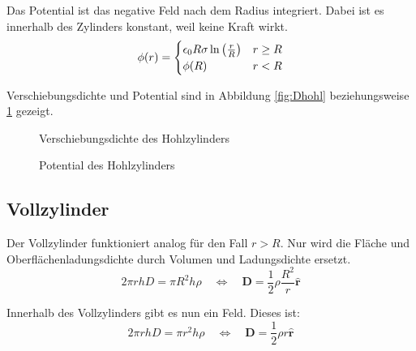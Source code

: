 \documentclass[11pt, ngerman]{article}
\newcommand{\half}{\frac 12}
\renewcommand{\vec}[1]{\boldsymbol{#1}}
\begin{document}
Das Potential ist das negative Feld nach dem Radius integriert. Dabei ist es innerhalb des Zylinders konstant, weil keine Kraft wirkt.
\[
	\phi(r) = \begin{cases}
		\epsilon_0 R \sigma \ln\del{\frac rR} & r \geq R \\
								 \phi(R) & r < R
	\end{cases}
\]

Verschiebungsdichte und Potential sind in Abbildung \ref{fig:Dhohl} beziehungsweise \ref{fig:phihohl} gezeigt.

\begin{figure}[h]
	\centering
	\begin{minipage}[b]{0.45\textwidth}
		\centering
		\caption{Verschiebungsdichte des Hohlzylinders}
		\label{fig:Dhohl}
	\end{minipage}
	\begin{minipage}[b]{0.45\textwidth}
		\centering
		\caption{Potential des Hohlzylinders}
		\label{fig:phihohl}
	\end{minipage}
\end{figure}

\subsection{Vollzylinder}

Der Vollzylinder funktioniert analog für den Fall $r > R$. Nur wird die Fläche und Oberflächenladungsdichte durch Volumen und Ladungsdichte ersetzt.
\[
	2 \pi r h D = \pi R^2 h \rho
	\quad \Leftrightarrow \quad
	\vec D = \half \rho \frac{R^2}{r} \hat{\vec r}
\]

Innerhalb des Vollzylinders gibt es nun ein Feld. Dieses ist:
\[
	2 \pi r h D = \pi r^2 h \rho
	\quad \Leftrightarrow \quad
	\vec D = \half \rho r \hat{\vec r}
\]
\end{document}
